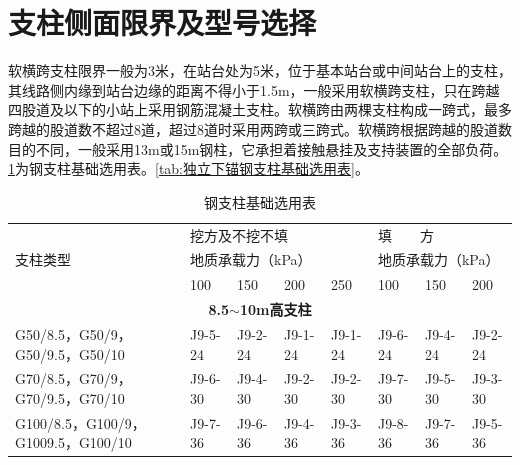 \section{支柱侧面限界及型号选择}

软横跨支柱限界一般为3米，在站台处为5米，位于基本站台或中间站台上的支柱，其线路侧内缘到站台边缘的距离不得小于1.5m，一般采用软横跨支柱，只在跨越四股道及以下的小站上采用钢筋混凝土支柱。软横跨由两棵支柱构成一跨式，最多跨越的股道数不超过8道，超过8道时采用两跨或三跨式。软横跨根据跨越的股道数目的不同，一般采用13m或15m钢柱，它承担着接触悬挂及支持装置的全部负荷。\ref{tab:钢支柱基础选用表}为钢支柱基础选用表。\ref{tab:独立下锚钢支柱基础选用表}。

\begin{longtable}[c]{|p{1.5cm}|p{1cm}|p{1cm}|p{1cm}|p{1cm}|p{1cm}|p{1cm}|p{1cm}|}
	\caption{钢支柱基础选用表}
	\label{tab:钢支柱基础选用表}\\
	\hline
	\multicolumn{1}{|l|}{\multirow{3}{*}{支柱类型}} &
	\multicolumn{4}{l|}{挖方及不挖不填} &
	\multicolumn{3}{l|}{填　　方} \\ \cline{2-8} 
	\multicolumn{1}{|l|}{} &
	\multicolumn{4}{l|}{地质承载力（kPa）} &
	\multicolumn{3}{l|}{地质承载力（kPa）} \\ \cline{2-8} 
	\multicolumn{1}{|l|}{} &
	\multicolumn{1}{l|}{100} &
	\multicolumn{1}{l|}{150} &
	\multicolumn{1}{l|}{200} &
	\multicolumn{1}{l|}{250} &
	\multicolumn{1}{l|}{100} &
	\multicolumn{1}{l|}{150} &
	200 \\ \hline
	\endfirsthead
	\endhead
	\multicolumn{8}{|c|}{\textbf{8.5$\sim$10m高支柱}} \\ \hline
	\multicolumn{1}{|p{2cm}|}{G50/8.5，G50/9，G50/9.5，G50/10} &
	\multicolumn{1}{l|}{J9-5-24} &
	\multicolumn{1}{l|}{J9-2-24} &
	\multicolumn{1}{l|}{J9-1-24} &
	\multicolumn{1}{l|}{J9-1-24} &
	\multicolumn{1}{l|}{J9-6-24} &
	\multicolumn{1}{l|}{J9-4-24} &
	J9-2-24 \\ \hline
	\multicolumn{1}{|p{2cm}|}{G70/8.5，G70/9，G70/9.5，G70/10} &
	\multicolumn{1}{l|}{J9-6-30} &
	\multicolumn{1}{l|}{J9-4-30} &
	\multicolumn{1}{l|}{J9-2-30} &
	\multicolumn{1}{l|}{J9-2-30} &
	\multicolumn{1}{l|}{J9-7-30} &
	\multicolumn{1}{l|}{J9-5-30} &
	J9-3-30 \\ \hline
	\multicolumn{1}{|p{2cm}|}{G100/8.5，G100/9，G1009.5，G100/10} &
	\multicolumn{1}{l|}{J9-7-36} &
	\multicolumn{1}{l|}{J9-6-36} &
	\multicolumn{1}{l|}{J9-4-36} &
	\multicolumn{1}{l|}{J9-3-36} &
	\multicolumn{1}{l|}{J9-8-36} &
	\multicolumn{1}{l|}{J9-7-36} &
	J9-5-36 \\ \hline

\end{longtable}
